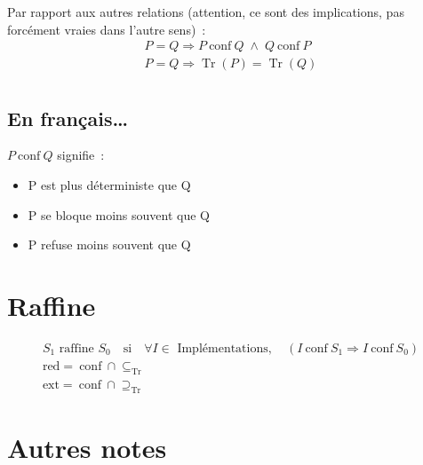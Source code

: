 \documentclass[a4paper,french,9pt]{article}
\def\conf{\ \text{conf}\ }
\DeclareMathOperator{\Tr}{Tr}
\def\si{\quad\text{si}\quad}
\begin{document}
Par rapport aux autres relations (attention, ce sont des implications, pas forcément vraies dans l'autre sens)~:
\begin{gather*}
  P = Q \Rightarrow P \conf Q \;\wedge\; Q \conf P\\
  P = Q \Rightarrow \Tr(P) = \Tr(Q)\\
\end{gather*}

\subsection{En français…}

$P\conf Q$ signifie~:
\begin{itemize}
\item P est plus déterministe que Q
\item P se bloque moins souvent que Q
\item P refuse moins souvent que Q
\end{itemize}

\section{Raffine}

\begin{gather*}
  S_1\text{ raffine } S_0\si \forall I \in \text{ Implémentations},\quad \left(I \conf S_1 \Rightarrow I \conf S_0\right)\\
  \text{red} = \conf \cap \subseteq_{\Tr}\\
  \text{ext} = \conf \cap \supseteq_{\Tr}
\end{gather*}

\begin{figure}
  \centering
\end{figure}

\section{Autres notes}
\end{document}
